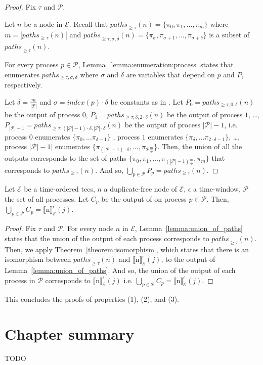 \begin{proof}
  Fix $\tau$ and $\mathcal{P}$.

  Let $n$ be a node in $\mathcal{E}$. Recall that ${paths}_{\ge \tau}(n) = \{ \pi_{0}, \pi_{1}, \ldots, \pi_{m} \}$ where $m = |paths_{\ge \tau}(n)|$ and ${paths}_{\ge \tau, \sigma, \delta}(n) = \{ \pi_{\sigma}, \pi_{\sigma+1}, \ldots, \pi_{\sigma+\delta}\}$ is a subset of ${paths}_{\ge \tau}(n)$.


  For every process $p \in \mathcal{P}$, Lemma~\ref{lemma:enumeration:process} states that  enumerates $paths_{\ge \tau, \sigma, \delta}$ where $\sigma$ and $\delta$ are variables that depend on $p$ and $P$, respectively.

  Let $\delta = \frac{m}{|\mathcal{P}|}$ and $\sigma = index(p) \cdot \delta$ be constants as in .
  Let $P_{0} = paths_{\ge \tau, 0, \delta}(n)$ be the output of process $0$, $P_{1} = paths_{\ge \tau, \delta, 2\cdot\delta}(n)$ be the output of process $1$, \ldots, $P_{|\mathcal{P}| - 1} = paths_{\ge \tau, (|\mathcal{P}| - 1) \cdot \delta, |\mathcal{P}| \cdot \delta}(n)$ be the output of process $|\mathcal{P}| - 1$, i.e. process $0$ enumerates $\{ \pi_{0}, \ldots \pi_{\delta-1} \}$ , process $1$ enumerates $\{\pi_{\delta}, \ldots \pi_{2 \cdot \delta-1}\}$, \ldots, process $|\mathcal{P}| - 1|$ enumerates $\{\pi_{(|\mathcal{P}| - 1) \cdot \delta}, \ldots, \pi_{\mathcal{P}\frac{m}{\mathcal{P}}}\}$.
  Then, the union of all the outputs corresponds to the set of paths $\{ \pi_{0}, \pi_{1}, \ldots, \pi_{(|\mathcal{P}| - 1)\frac{m}{\mathcal{P}}}, \pi_{m} \}$ that corresponds to $paths_{\ge \tau}(n)$.
  And so, $\bigcup\limits_{p \in \mathcal{P}} P_{p} = paths_{\ge \tau}(n)$.
\end{proof}

\begin{theorem}\label{theorem:enumeration}
  Let $\mathcal{E}$ be a time-ordered \acrshort{tecs}, $n$ a duplicate-free node of $\mathcal{E}$, $\epsilon$ a time-window, $\mathcal{P}$ the set of all processes. Let $C_{p}$ be the output of  on process $p \in \mathcal{P}$. Then, $\bigcup\limits_{p \in \mathcal{P}} C_{p} = {\llbracket \text{n} \rrbracket}^{\epsilon}_{\mathcal{E}}(j)$.
\end{theorem}

\begin{proof}
  Fix $\tau$ and $\mathcal{P}$. For every node $n$ in $\mathcal{E}$, Lemma~\ref{lemma:union_of_paths} states that the union of the output of each process corresponds to ${paths}_{\ge \tau}(n)$. Then, we apply Theorem~\ref{theorem:isomorphism}, which states that there is an isomorphism between ${paths}_{\ge \tau}(n)$ and ${\llbracket \text{n} \rrbracket}^{\epsilon}_{\mathcal{E}}(j)$, to the output of Lemma~\ref{lemma:union_of_paths}. And so, the union of the output of each process in $\mathcal{P}$ corresponds to ${\llbracket \text{n} \rrbracket}^{\epsilon}_{\mathcal{E}}(j)$ i.e. $\bigcup\limits_{p \in \mathcal{P}} C_{p} = {\llbracket \text{n} \rrbracket}^{\epsilon}_{\mathcal{E}}(j)$.
\end{proof}

This concludes the proofs of properties (1), (2), and (3).

\section{Chapter summary}

TODO
